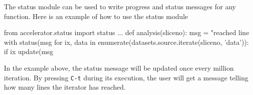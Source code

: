 The status module can be used to write progress and status messages
for any function.  Here is an example of how to use the status module
\begin{python}
from accelerator.status import status
...
def analysis(sliceno):
    msg = "reached line %
    with status(msg %
        for ix, data in enumerate(datasets.source.iterate(sliceno, 'data')):
            if ix %
                update(msg %
\end{python}
In the example above, the status message will be updated once every
million iteration.  By pressing \texttt{C-t} during its execution, the
user will get a message telling how many lines the iterator has
reached.











